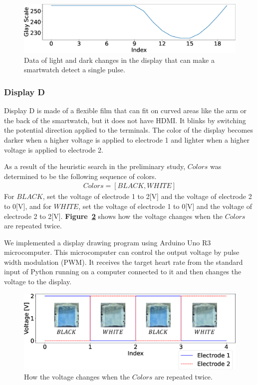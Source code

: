 \documentclass[sigchi,authordraft]{acmart}
\newcommand\figref[1]{\textbf{Figure~\ref{fig:#1}}}
\begin{document}
\begin{figure}[!t]
  \centering
  \includegraphics[width=1\linewidth]{figures/colors_wave.eps}
  \caption{Data of light and dark changes in the display that can make a smartwatch detect a single pulse.}
  \label{fig:colors_wave}
\end{figure}

\subsubsection{Display D}
Display D is made of a flexible film that can fit on curved areas like the arm or the back of the smartwatch, but it does not have HDMI. It blinks by switching the potential direction applied to the terminals. The color of the display becomes darker when a higher voltage is applied to electrode 1 and lighter when a higher voltage is applied to electrode 2.\par

As a result of the heuristic search in the preliminary study, $Colors$ was determined to be the following sequence of colors.
\begin{equation*}
  \begin{split}
    Colors = [BLACK, WHITE]
  \end{split}
\end{equation*}
For $BLACK$, set the voltage of electrode 1 to 2[V] and the voltage of electrode 2 to 0[V], and for $WHITE$, set the voltage of electrode 1 to 0[V] and the voltage of electrode 2 to 2[V]. \figref{colors_flexible} shows how the voltage changes when the $Colors$ are repeated twice.\par

We implemented a display drawing program using Arduino Uno R3 microcomputer. This microcomputer can control the output voltage by pulse width modulation (PWM). It receives the target heart rate from the standard input of Python running on a computer connected to it and then changes the voltage to the display.

\begin{figure}[!t]
  \centering
  \includegraphics[width=1\linewidth]{figures/voltage_wave.eps}
  \caption{How the voltage changes when the $Colors$ are repeated twice.}
  \label{fig:colors_flexible}
\end{figure}
\end{document}
